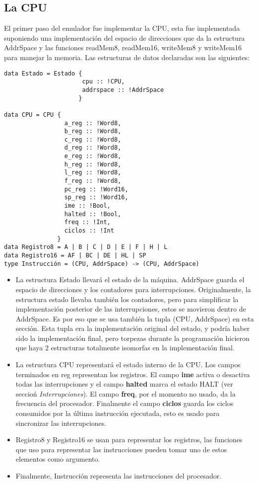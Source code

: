 \documentclass[a4paper,10pt]{report}
\begin{document}
\subsection*{La CPU}
El primer paso del emulador fue implementar la CPU, esta fue implementada suponiendo una implementación del espacio de direcciones que da la estructura AddrSpace y las funciones readMem8, readMem16, writeMem8 y writeMem16 para manejar la memoria.
\clearpage
Las estructuras de datos declaradas son las siguientes:
\begin{verbatim}
data Estado = Estado { 
                      cpu :: !CPU,
                      addrspace :: !AddrSpace
                     }

data CPU = CPU {
                 a_reg :: !Word8,
                 b_reg :: !Word8,
                 c_reg :: !Word8,
                 d_reg :: !Word8,
                 e_reg :: !Word8,
                 h_reg :: !Word8,
                 l_reg :: !Word8,
                 f_reg :: !Word8,
                 pc_reg :: !Word16,
                 sp_reg :: !Word16,
                 ime :: !Bool,
                 halted :: !Bool,
                 freq :: !Int,
                 ciclos :: !Int
               }
data Registro8 = A | B | C | D | E | F | H | L
data Registro16 = AF | BC | DE | HL | SP
type Instrucción = (CPU, AddrSpace) -> (CPU, AddrSpace)
\end{verbatim}
\begin{itemize}
  \item La estructura Estado llevará el estado de la máquina. AddrSpace guarda el espacio de direcciones y los contadores para interrupciones. Originalmente, la estructura estado llevaba también los contadores, pero para simplificar la implementación posterior de las interrupciones, estos se movieron dentro de AddrSpace. Es por eso que se usa también la tupla (CPU, AddrSpace) en esta sección. Esta tupla era la implementación original del estado, y podría haber sido la implementación final, pero torpezas durante la programación hicieron que haya 2 estructuras totalmente isomorfas en la implementación final.
  \item La estructura CPU representará el estado interno de la CPU. Los campos terminados en reg representan los registros. El campo \textbf{ime} activa o desactiva todas las interrupciones y el campo \textbf{halted} marca el estado HALT (ver seccioń \textit{Interrupciones}). El campo \textbf{freq}, por el momento no usado, da la frecuencia del procesador. Finalmente el campo \textbf{ciclos} guarda los ciclos consumidos por la última instrucción ejecutada, esto es usado para sincronizar las interrupciones.
  \item Registro8 y Registro16 se usan para representar los registros,  las funciones que uso para representar las instrucciones pueden tomar uno de estos elementos como argumento.
  \item Finalmente, Instrucción representa las instrucciones del procesador.
\end{itemize}
\end{document}

